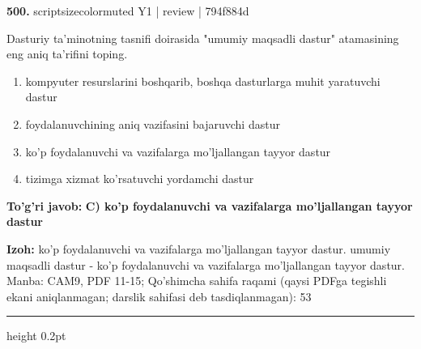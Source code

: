 \documentclass[10pt,a4paper]{article}
\begin{document}
{\bfseries\sffamily\color{ink} 500.} {scriptsizecolor{muted} Y1 | review | 794f884d}
\par
Dasturiy ta'minotning tasnifi doirasida "umumiy maqsadli dastur" atamasining eng aniq ta'rifini toping.
\begin{enumerate}[label=\Alph*),leftmargin=9mm]
\item kompyuter resurslarini boshqarib, boshqa dasturlarga muhit yaratuvchi dastur
\item foydalanuvchining aniq vazifasini bajaruvchi dastur
\item ko'p foydalanuvchi va vazifalarga mo'ljallangan tayyor dastur
\item tizimga xizmat ko'rsatuvchi yordamchi dastur
\end{enumerate}
\begin{tcolorbox}[enhanced,breakable,colback=teal!4,colframe=teal!60!black,boxrule=0.45pt,arc=1.2mm,left=2.7mm,right=2.7mm,top=1.8mm,bottom=1.8mm,before skip=2mm,after skip=2mm]
{\bfseries\sffamily\color{teal}To'g'ri javob:} \textbf{C) ko'p foydalanuvchi va vazifalarga mo'ljallangan tayyor dastur}
\par\smallskip
{\bfseries Izoh:} ko'p foydalanuvchi va vazifalarga mo'ljallangan tayyor dastur. umumiy maqsadli dastur - ko'p foydalanuvchi va vazifalarga mo'ljallangan tayyor dastur. Manba: CAM9, PDF 11-15; Qo'shimcha sahifa raqami (qaysi PDFga tegishli ekani aniqlanmagan; darslik sahifasi deb tasdiqlanmagan): 53
\end{tcolorbox}
\vspace{2mm}\hrule height 0.2pt\vspace{3mm}
\end{document}
